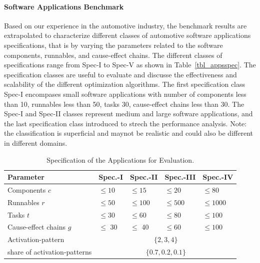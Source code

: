 \paragraph{Software Applications Benchmark} Based on our experience in the automotive industry, the benchmark results  are extrapolated to characterize different classes of automotive software applications specifications, that is by varying the parameters related to the software components, runnables, and cause-effect chains. The different classes of specifications range from Spec-I to Spec-V as shown in Table~\ref{tbl_appsspec}. The specification classes are useful to evaluate and discusse the effectiveness and scalability of the different optimization algorithms. The first specification class Spec-I encompases small software applications with number of components less than 10, runnables less than 50, tasks 30, cause-effect chains less than 30. The Spec-I and Spec-II classes represent medium and large software applications, and the last specification class introduced to strech the performance analysis. Note: the classification is superficial and maynot be realistic and could also be different in different domains.
\begin{table}
\centering\small
\begin{tabular}{@{}lllll@{}}
\toprule
Parameter  		& Spec.-I  & Spec.-II & Spec.-III & Spec.-IV\\
\midrule
Components $c$		& $\leq 10$	& $\leq 15$ 	&$\leq 20$ & $\leq 80$\\ 
Runnables $r$		& $\leq 50$	& $\leq 100$ 	& $\leq 500$&$\leq 1000$\\
Tasks $t$ 			& $\leq 30$ & $\leq 60$ 	& $\leq 80$&$\leq 100$\\
Cause-effect chains $g$ & $\leq$ 30 & $\leq$ 40 & $\leq 60$&$\leq100$\\ \midrule
Activation-pattern	& \multicolumn{4}{c}{$\{2,3,4\}$}\\ \midrule
share of activation-patterns	& \multicolumn{4}{c}{$\{0.7, 0.2, 0.1\}$}\\
\bottomrule
\end{tabular}
\caption{Specification of the Applications for Evaluation.}
\label{tbl_app_ranges}
\end{table}

